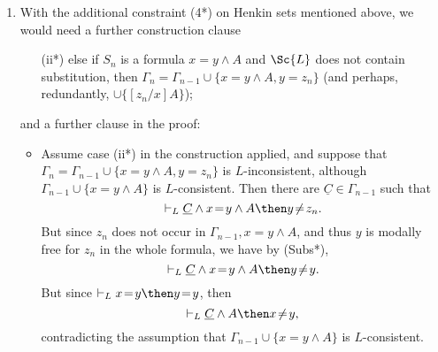 \documentclass[11pt]{woarticle}
\theoremstyle{break}
\theoremstyle{nonumberplain}
\newcommand{\1}{\;\,|\;\,}
\newcommand{\var}{\emph{Var}}
\renewcommand{\t}[1]{\ensuremath{\langle #1  \makebox[.2ex]{}\rangle}}
\renewcommand{\vec}[1]{\ensuremath{\underline{#1}}}
\newcommand{\T}[1]{\ensuremath{(\mathrm{ #1})}}
\begin{document}
{\begin{enumerate}
\begin{itemize}
\begin{alignat*}{2}
        6.\quad& \vdash_{L} \vec{C} \land \exists x A \then
        \forall z_n \neg \t{z_n:x}A.
        &&\text{(5, \T{\forall Ex})}\\
        7.\quad& \vdash_{L} \neg \t{z_n:x} A \then  \t{z_n:x}\neg A 
        &\quad& \text{\T{S\neg}}\\
        8.\quad& \vdash_{L} \forall z_n \neg \t{z_n:x} A \then \forall z_n 
        \t{z_n:x} \neg A &\quad& \text{(7, \T{UG}, \T{UD})}\\
        9.\quad& \vdash_{L} \forall z_n \t{z_n:x}\neg A \then \forall x 
        \neg A &\quad& \text{(\T{SBV}, $z_n \not\in \var(A)$)}\\
        10.\quad& \vdash_{L} \vec{C} \land \exists x A 
        \then \neg \exists x A.&& \text{(6, 8, 9)}
      \end{alignat*}
      So $\{ C_1,\ldots C_m, \exists x A \}$ is not
      $L$-consistent, contradicting the assumption that clause
      (ii) applies.
    \end{itemize}
    
  \item With the additional constraint (4*) on Henkin sets mentioned
    above, we would need a further construction clause
    \begin{enumerate}
    \item[(ii*)] else if $S_n$ is a formula $x\!=\!y \land A$ and
      $\Sc{L}$ does not contain substitution, then $\Gamma_n =
      \Gamma_{n-1} \cup \{ x\!=\!y \land A, y\!=\!z_n \}$ (and
      perhaps, redundantly, $\cup \{ [z_n/x]A \}$);
    \end{enumerate}
    and a further clause in the proof:
    \begin{itemize}
    \item Assume case (ii*) in the construction applied, and suppose
      that $\Gamma_n = \Gamma_{n-1} \cup \{ x\!=\!y \land A, y\!=\!z_n
      \}$ is $L$-inconsistent, although $\Gamma_{n-1} \cup \{
      x\!=\!y \land A \}$ is $L$-consistent.  Then there are
      $\vec{C} \in \Gamma_{n-1}$ such that
      \[
      \vdash_{L} \vec{C} \land x\!=\!y \land A \then
      y\!\not=\!z_n.
      \]
      But since $z_n$ does not occur in $\Gamma_{n-1}, x\!=\!y \land
      A$, and thus $y$ is modally free for $z_n$ in the whole formula,
      we have by (Subs*),
      \[
      \vdash_{L} \vec{C} \land x\!=\!y \land A \then
      y\!\not=\!y.
      \]
      But since $\vdash_{L} x\!=\!y \then y\!=\!y$, then
      \[
      \vdash_{L} \vec{C} \land A \then x\!\not=\!y,
      \]
      contradicting the assumption that $\Gamma_{n-1} \cup \{
      x\!=\!y \land A \}$ is $L$-consistent.
    \end{itemize}
    

\end{enumerate}}
\end{document}
